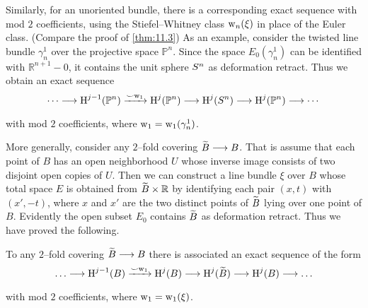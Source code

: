 \documentclass[../main]{subfiles}
\begin{document}
Similarly, for an unoriented bundle, there is a corresponding exact sequence with mod $2$ coefficients, using the Stiefel--Whitney class $\operatorname{w}_n(\xi)$ in place of the Euler class. (Compare the proof of \ref{thm:11.3}) As an example, consider the twisted line bundle $\gamma_n^1$ over the projective space ${\mathbb P}^n$. Since the space $E_0(\gamma_n^1)$ can be identified with ${\mathbb R}^{n + 1} - 0$, it contains the unit sphere $S^n$ as deformation retract. Thus we obtain an exact sequence \[\cdots \varrightarrow{} \homology^{j - 1}({\mathbb P}^n) \varrightarrow{\smile \sw_1} \homology^j({\mathbb P}^n) \varrightarrow{} \homology^j(\sphere^n) \varrightarrow{} \homology^j({\mathbb P}^n) \varrightarrow{} \cdots\] with mod $2$ coefficients, where $\operatorname{w}_1 = \operatorname{w}_1(\gamma_n^1)$. 

More generally, consider any $2$--fold covering ${\xtilde B} \longrightarrow B$. That is assume that each point of $B$ has an open neighborhood $U$ whose inverse image consists of two disjoint open copies of $U$. Then we can construct a line bundle $\xi$ over $B$ whose total space $E$ is obtained from ${\xtilde B} \times \mathbb R$ by identifying each pair $(x, t)$ with $(x', -t)$, where $x$ and $x'$ are the two distinct points of ${\xtilde B}$ lying over one point of $B$. Evidently the open subset $E_0$ contains ${\xtilde B}$ as deformation retract. Thus we have proved the following. 

\begin{corollary}\label{cor:12.3}
To any $2$--fold covering ${\xtilde B} \longrightarrow B$ there is associated an exact sequence of the form \[\ldots \varrightarrow{} \homology^{j - 1}(B) \varrightarrow{\smile \sw_1} \homology^j(B) \varrightarrow{} \homology^j({\xtilde B}) \varrightarrow{} \homology^j(B) \varrightarrow{} \ldots\] with mod $2$ coefficients, where $\operatorname{w}_1 = \operatorname{w}_1(\xi)$. 
\end{corollary}
\end{document}
